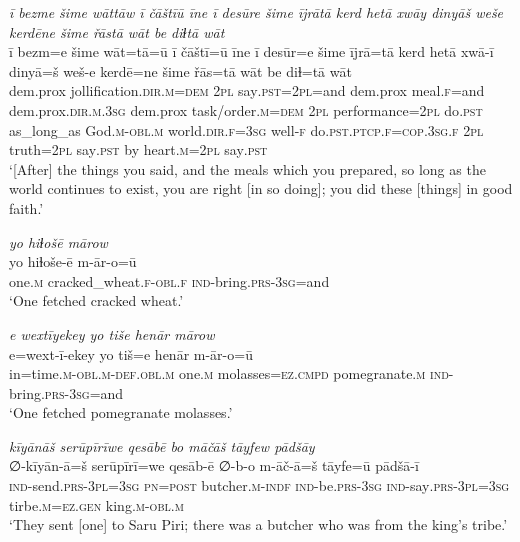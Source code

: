 \ea \label{ŽP.244}
\textit{ī bezme šime wāttāw ī čāštīū īne ī desūre šime ījrātā kerd hetā xwāy dinyāš weše kerdēne šime řāstā wāt be diɫtā wāt} \\ 
\gll ī bezm=e šime wāt=tā=ū ī čāštī=ū īne ī desūr=e šime ījrā=tā kerd hetā xwā-ī dinyā=š weš-e kerdē=ne šime řās=tā wāt be diɫ=tā wāt \\ 
 dem.prox jollification\textsc{.dir}\textsc{.m}\textsc{=dem} \textsc{2pl} say\textsc{.pst}=\textsc{2pl}=and dem.prox meal\textsc{.f}=and dem.prox\textsc{.dir}\textsc{.m}\textsc{.3sg} dem.prox task/order\textsc{.m}\textsc{=dem} \textsc{2pl} performance=\textsc{2pl} do\textsc{.pst} as\_long\_as God\textsc{.m}\textsc{-obl}\textsc{.m} world\textsc{.dir}\textsc{.f}\textsc{=3sg} well\textsc{-f} do\textsc{.pst}\textsc{.ptcp}\textsc{.f}\textsc{=cop}\textsc{.3sg}\textsc{.f} \textsc{2pl} truth=\textsc{2pl} say\textsc{.pst} by heart\textsc{.m}=\textsc{2pl} say\textsc{.pst} \\ 
\glt `[After] the things you said, and the meals which you prepared, so long as the world continues to exist, you are right [in so doing]; you did these [things] in good faith.'
\z 
 
\ea \label{ŽP.247}
\textit{yo hiɫošē mārow} \\ 
\gll yo hiɫoše-ē m-ār-o=ū \\ 
 one\textsc{.m} cracked\_wheat\textsc{.f}\textsc{-obl}\textsc{.f} \textsc{ind-}bring\textsc{.prs}\textsc{-3sg}=and \\ 
\glt `One fetched cracked wheat.'
\z 
 
\ea \label{ŽP.249}
\textit{e wextīyekey yo tiše henār mārow} \\ 
\gll e=wext-ī-ekey yo tiš=e henār m-ār-o=ū \\ 
 in=time\textsc{.m}\textsc{-obl}\textsc{.m}\textsc{-def}\textsc{.obl}\textsc{.m} one\textsc{.m} molasses\textsc{=ez}\textsc{.cmpd} pomegranate\textsc{.m} \textsc{ind-}bring\textsc{.prs}\textsc{-3sg}=and \\ 
\glt `One fetched pomegranate molasses.'
\z 
 
\ea \label{ŽP.251}
\textit{kīyānāš serūpīrīwe qesābē bo māčāš tāyfew pādšāy} \\ 
\gll ∅-kīyān-ā=š serūpīrī=we qesāb-ē ∅-b-o m-āč-ā=š tāyfe=ū pādšā-ī \\ 
 \textsc{ind-}send\textsc{.prs}\textsc{-3pl}\textsc{=3sg} \textsc{pn}\textsc{=\textsc{post}} butcher\textsc{.m}\textsc{-indf} \textsc{ind-}be\textsc{.prs}\textsc{-3sg} \textsc{ind-}say\textsc{.prs}\textsc{-3pl}\textsc{=3sg} tirbe\textsc{.m}\textsc{\textsc{=ez.gen}} king\textsc{.m}\textsc{-obl}\textsc{.m} \\ 
\glt `They sent [one] to Saru Piri; there was a butcher who was from the king’s tribe.'
\z 
 
